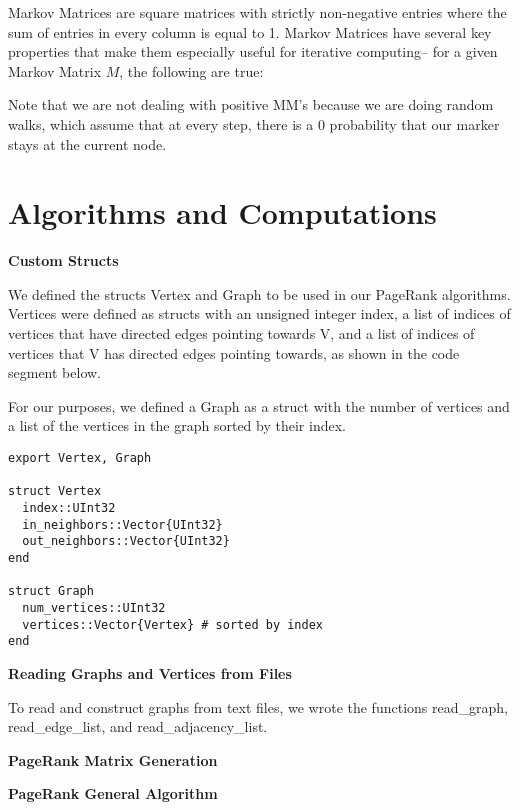 \documentclass[12pt, titlepage, twoside]{amsart}
\theoremstyle{remark}
\begin{document}
Markov Matrices are square matrices with strictly non-negative entries where the sum of entries in every column is equal to 1. Markov Matrices have several key properties that make them especially useful for iterative computing-- for a given Markov Matrix $M$, the following are true:


Note that we are not dealing with positive MM's because we are doing random walks, which assume that at every step, there is a 0 probability that our marker stays at the current node.


\section{Algorithms and Computations}

\textbf{Custom Structs}

We defined the structs Vertex and Graph to be used in our PageRank algorithms. Vertices were defined as structs with an unsigned integer index, a list of indices of vertices that have directed edges pointing towards V, and a list of indices of vertices that V has directed edges pointing towards, as shown in the code segment below. 

For our purposes, we defined a Graph as a struct with the number of vertices and a list of the vertices in the graph sorted by their index.

\begin{lstlisting}
export Vertex, Graph

struct Vertex
  index::UInt32
  in_neighbors::Vector{UInt32}
  out_neighbors::Vector{UInt32}
end

struct Graph
  num_vertices::UInt32
  vertices::Vector{Vertex} # sorted by index
end
\end{lstlisting}


\textbf{Reading Graphs and Vertices from Files}

To read and construct graphs from text files, we wrote the functions read\_graph, read\_edge\_list, and read\_adjacency\_list.  

\textbf{PageRank Matrix Generation}


\textbf{PageRank General Algorithm}
\end{document}
